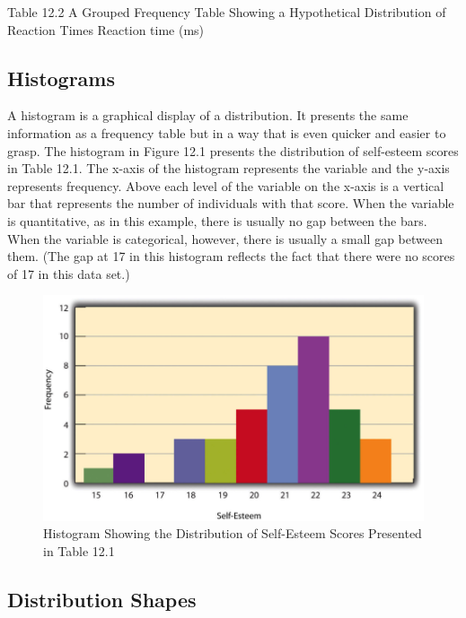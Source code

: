 Table 12.2 A Grouped Frequency Table Showing a Hypothetical Distribution of Reaction Times
 Reaction time (ms)



\subsection{Histograms}

A histogram is a graphical display of a distribution. It presents the same information as a frequency table but in a way that is even quicker and easier to grasp. The histogram in Figure 12.1 presents the distribution of self-esteem scores in Table 12.1. The x-axis of the histogram represents the variable and the y-axis represents frequency. Above each level of the variable on the x-axis is a vertical bar that represents the number of individuals with that score. When the variable is quantitative, as in this example, there is usually no gap between the bars. When the variable is categorical, however, there is usually a small gap between them. (The gap at 17 in this histogram reflects the fact that there were no scores of 17 in this data set.)


\begin{figure}

\includegraphics[width=\linewidth]{figures/Fig121}

\caption{Histogram Showing the Distribution of Self-Esteem Scores Presented in Table 12.1}

\label{fig:hist}
\end{figure}

\subsection{Distribution Shapes}


